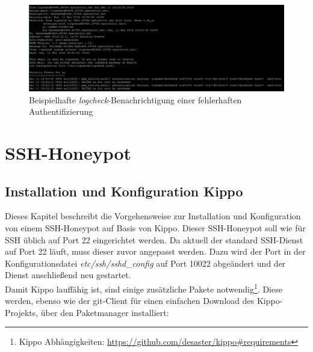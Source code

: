 \begin{figure}[ht]
	\centering
		\includegraphics[width=1.0\textwidth]{img/logcheck_benachrichtigung.png}
	\caption{Beispielhafte \textit{logcheck}-Benachrichtigung einer fehlerhaften Authentifizierung}
	\label{fig:logcheck}
\end{figure}



\section{SSH-Honeypot}
\label{sec:SSH-Honeypot}

\subsection{Installation und Konfiguration Kippo}
\label{subsec:Installation und Konfiguration Kippo}



Dieses Kapitel beschreibt die Vorgehensweise zur Installation und Konfiguration von einem SSH-Honeypot auf Basis von Kippo. Dieser SSH-Honeypot soll wie für SSH üblich auf Port 22 eingerichtet werden. Da aktuell der standard SSH-Dienst auf Port 22 läuft, muss dieser zuvor angepasst werden. Dazu wird der Port in der Konfigurationsdatei \textit{etc/ssh/sshd\_config} auf Port 10022 abgeändert und der Dienst anschließend neu gestartet.\\

Damit Kippo lauffähig ist, sind einige zusätzliche Pakete notwendig\footnote{ Kippo Abhängigkeiten: \url{https://github.com/desaster/kippo\#requirements}}. Diese werden, ebenso wie der git-Client für einen einfachen Download des Kippo-Projekts, über den Paketmanager installiert:

